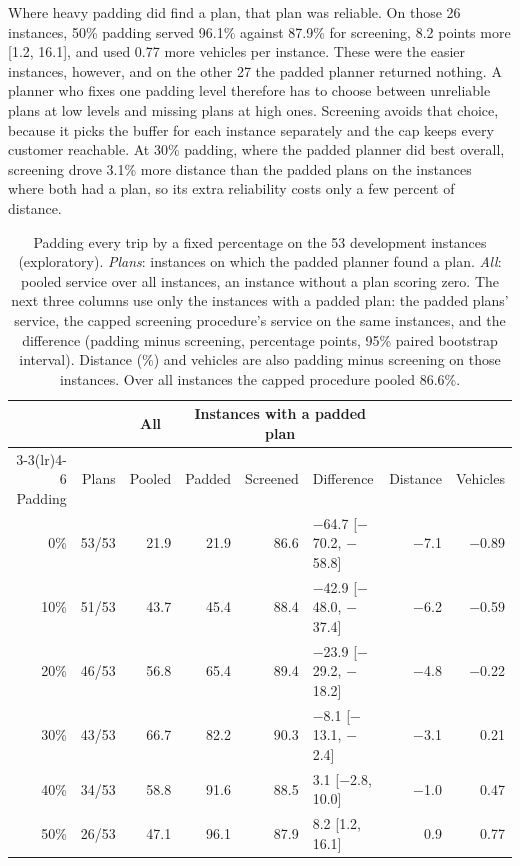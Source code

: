 \documentclass[12pt,letterpaper]{article}
\newcommand{\PadThirtyDistAbs}{3.1}
\newcommand{\PadFiftyPlans}{26}
\newcommand{\PadFiftyNoPlan}{27}
\newcommand{\PadFiftyOnPlans}{96.1}
\newcommand{\PadFiftyCapOnPlans}{87.9}
\newcommand{\PadFiftyDiff}{8.2}
\newcommand{\PadFiftyDiffLo}{1.2}
\newcommand{\PadFiftyDiffHi}{16.1}
\newcommand{\PadFiftyFleet}{0.77}
\begin{document}
Where heavy padding did find a plan, that plan was reliable. On those \PadFiftyPlans{}
instances, 50\% padding served \PadFiftyOnPlans\% against \PadFiftyCapOnPlans\% for
screening, \PadFiftyDiff{} points more [\PadFiftyDiffLo, \PadFiftyDiffHi], and used
\PadFiftyFleet{} more vehicles per instance. These were the easier instances,
however, and on the other \PadFiftyNoPlan{} the padded planner returned nothing. A
planner who fixes one padding level therefore has to choose between unreliable plans
at low levels and missing plans at high ones. Screening avoids that choice, because
it picks the buffer for each instance separately and the cap keeps every customer
reachable. At 30\% padding, where the padded planner did best overall, screening drove
\PadThirtyDistAbs\% more distance than the padded plans on the instances where both
had a plan, so its extra reliability costs only a few percent of distance.

\begin{table}[t]
\centering
\small
\setlength{\tabcolsep}{4pt}
\caption{Padding every trip by a fixed percentage on the 53 development instances (exploratory). \emph{Plans}: instances on which the padded planner found a plan. \emph{All}: pooled service over all instances, an instance without a plan scoring zero. The next three columns use only the instances with a padded plan: the padded plans' service, the capped screening procedure's service on the same instances, and the difference (padding minus screening, percentage points, 95\% paired bootstrap interval). Distance (\%) and vehicles are also padding minus screening on those instances. Over all instances the capped procedure pooled 86.6\%.}
\label{tab:padding}
\begin{tabular}{@{}rrrrrlrr@{}}
\toprule
 & & \multicolumn{1}{c}{All} & \multicolumn{3}{c}{Instances with a padded plan} & & \\
\cmidrule(lr){3-3}\cmidrule(lr){4-6}
Padding & Plans & Pooled & Padded & Screened & Difference & Distance & Vehicles\\
\midrule
0\% & 53/53 & 21.9 & 21.9 & 86.6 & $-$64.7 [$-$70.2, $-$58.8] & $-$7.1 & $-$0.89\\
10\% & 51/53 & 43.7 & 45.4 & 88.4 & $-$42.9 [$-$48.0, $-$37.4] & $-$6.2 & $-$0.59\\
20\% & 46/53 & 56.8 & 65.4 & 89.4 & $-$23.9 [$-$29.2, $-$18.2] & $-$4.8 & $-$0.22\\
30\% & 43/53 & 66.7 & 82.2 & 90.3 & $-$8.1 [$-$13.1, $-$2.4] & $-$3.1 & 0.21\\
40\% & 34/53 & 58.8 & 91.6 & 88.5 & 3.1 [$-$2.8, 10.0] & $-$1.0 & 0.47\\
50\% & 26/53 & 47.1 & 96.1 & 87.9 & 8.2 [1.2, 16.1] & 0.9 & 0.77\\
\bottomrule
\end{tabular}
\end{table}
\end{document}
